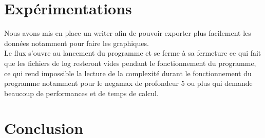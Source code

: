 \documentclass[12pt]{article}
\begin{document}
\section{Expérimentations}

Nous avons mis en place un writer afin de pouvoir exporter plus facilement les données notamment pour faire les graphiques.\\

Le flux s'ouvre au lancement du programme et se ferme à sa fermeture ce qui fait que les fichiers de log resteront vides pendant le fonctionnement du programme, ce qui rend impossible la lecture de la complexité durant le fonctionnement du programme notamment pour le negamax de profondeur 5 ou plus qui demande beaucoup de performances et de temps de calcul.


\section{Conclusion}
\end{document}
